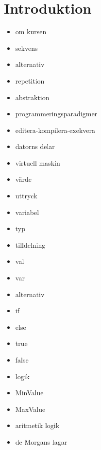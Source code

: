 \chapter{Introduktion}
\begin{itemize}[nosep]
\item om kursen
\item sekvens
\item alternativ
\item repetition
\item abstraktion
\item programmeringsparadigmer
\item editera-kompilera-exekvera
\item datorns delar
\item virtuell maskin
\item värde
\item uttryck
\item variabel
\item typ
\item tilldelning
\item val
\item var
\item alternativ
\item if
\item else
\item true
\item false
\item logik
\item MinValue
\item MaxValue
\item aritmetik logik
\item de Morgans lagar\end{itemize}